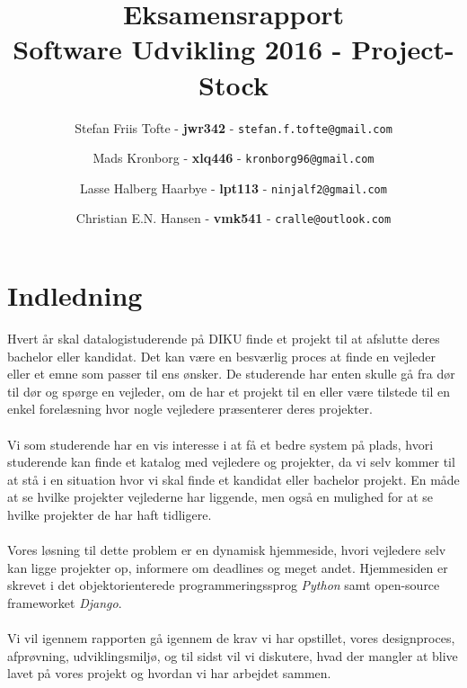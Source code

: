 \documentclass[12pt]{article}
\title{
  \vspace{3cm}
  \Huge{Eksamensrapport} \\
  \Large{Software Udvikling 2016 - Project-Stock}
	}
\author{
	\Large{Stefan Friis Tofte} - \textbf{jwr342} - \texttt{stefan.f.tofte@gmail.com}
	\and
	\Large{Mads Kronborg} - \textbf{xlq446} - \texttt{kronborg96@gmail.com}
	\and
	\Large{Lasse Halberg Haarbye} - \textbf{lpt113} - \texttt{ninjalf2@gmail.com}
	\and
	\Large{Christian E.N. Hansen} - \textbf{vmk541} - \texttt{cralle@outlook.com}
}
\def \ColourPDF {../include/ku-farve}
\def \TitlePDF {../include/ku-en}  %
\begin{document}


\clearpage\maketitle
\thispagestyle{empty}

\newpage
\tableofcontents
\newpage

\section{Indledning}
\label{sec:indledning}
Hvert år skal datalogistuderende på DIKU finde et projekt til at afslutte deres bachelor eller kandidat. Det kan være en besværlig proces at finde en vejleder eller et emne som passer til ens ønsker. De studerende har enten skulle gå fra dør til dør og spørge en vejleder, om de har et projekt til en eller være tilstede til en enkel forelæsning hvor nogle vejledere præsenterer deres projekter. \\ \\
Vi som studerende har en vis interesse i at få et bedre system på plads, hvori studerende kan finde et katalog med vejledere og projekter, da vi selv kommer til at stå i en situation hvor vi skal finde et kandidat eller bachelor projekt. En måde at se hvilke projekter vejlederne har liggende, men også en mulighed for at se hvilke projekter de har haft tidligere. \\ \\
Vores løsning til dette problem er en dynamisk hjemmeside, hvori vejledere selv kan ligge projekter op, informere om deadlines og meget andet. Hjemmesiden er skrevet i det objektorienterede programmeringssprog \textit{Python} samt open-source frameworket \textit{Django}. \\ \\
Vi vil igennem rapporten gå igennem de krav vi har opstillet, vores designproces, afprøvning, udviklingsmiljø, og til sidst vil vi diskutere, hvad der mangler at blive lavet på vores projekt og hvordan vi har arbejdet sammen.\\
\end{document}

